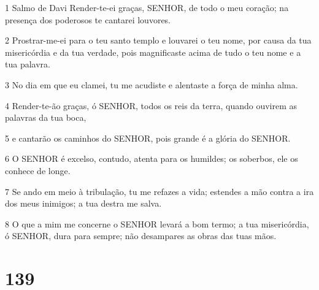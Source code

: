 \par 1 Salmo de Davi Render-te-ei graças, SENHOR, de todo o meu coração; na presença dos poderosos te cantarei louvores.
\par 2 Prostrar-me-ei para o teu santo templo e louvarei o teu nome, por causa da tua misericórdia e da tua verdade, pois magnificaste acima de tudo o teu nome e a tua palavra.
\par 3 No dia em que eu clamei, tu me acudiste e alentaste a força de minha alma.
\par 4 Render-te-ão graças, ó SENHOR, todos os reis da terra, quando ouvirem as palavras da tua boca,
\par 5 e cantarão os caminhos do SENHOR, pois grande é a glória do SENHOR.
\par 6 O SENHOR é excelso, contudo, atenta para os humildes; os soberbos, ele os conhece de longe.
\par 7 Se ando em meio à tribulação, tu me refazes a vida; estendes a mão contra a ira dos meus inimigos; a tua destra me salva.
\par 8 O que a mim me concerne o SENHOR levará a bom termo; a tua misericórdia, ó SENHOR, dura para sempre; não desampares as obras das tuas mãos.

\chapter{139}

